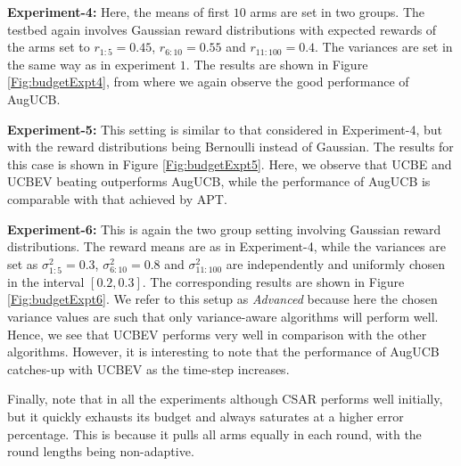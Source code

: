 	
\textbf{Experiment-4:} Here, the means of first $10$ arms are set in two groups.  The testbed again involves Gaussian reward distributions with expected rewards of the arms set to $r_{1:5}=0.45$, $r_{6:10}=0.55$ and $r_{11:100}=0.4$. The variances are set in the same way as in experiment $1$. The results are shown in Figure \ref{Fig:budgetExpt4}, from where we again observe the good performance of AugUCB.

	
\textbf{Experiment-5:} 
This setting is similar to that considered in Experiment-4, but with the reward distributions being Bernoulli instead of Gaussian.  
The results for this case is shown in Figure \ref{Fig:budgetExpt5}. Here, we observe that UCBE and UCBEV beating outperforms AugUCB, while the performance of  AugUCB is comparable with that achieved by APT.
	
\textbf{Experiment-6:} This is again the two group setting involving Gaussian reward distributions. The reward means are as in Experiment-4, while the 
variances are set as $\sigma_{1:5}^{2}=0.3$, $\sigma_{6:10}^{2}=0.8$ and $\sigma_{11:100}^{2}$ are independently and uniformly chosen in the interval $[0.2,0.3]$.  The corresponding results are shown in Figure \ref{Fig:budgetExpt6}.
 We refer to this setup as \emph{Advanced} because 
here the chosen variance values are such that only  variance-aware algorithms will perform well.
Hence, we see that UCBEV performs very well in comparison with the other algorithms. However,  it is interesting to note that the performance of  AugUCB catches-up with UCBEV as the time-step increases. 


Finally, note that in all the experiments although CSAR performs well initially, but it quickly exhausts its budget and always saturates at a higher error percentage. This is because it pulls all arms equally in each round, with the round lengths being non-adaptive.





